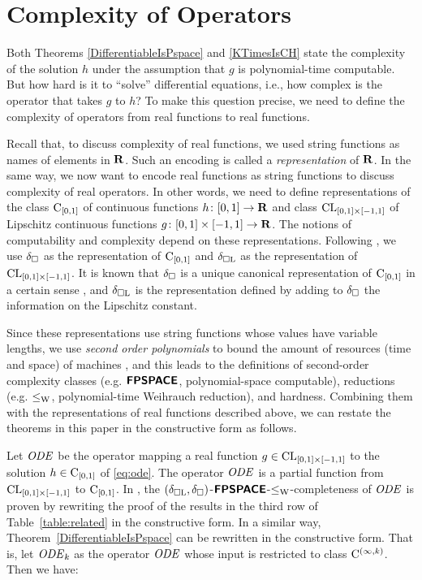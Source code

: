 \section{Complexity of Operators}

Both Theorems \ref{DifferentiableIsPspace} and \ref{KTimesIsCH}
state the complexity of the solution $h$ under the assumption 
that $g$ is polynomial-time computable.
But how hard is it to ``solve'' differential equations,
i.e., how complex is the operator that takes $g$ to $h$? 
To make this question precise,
we need to define the complexity of operators from real functions to real functions.

Recall that, to discuss complexity of real functions,
we used string functions as names of elements in $\mathbf R$. 
Such an encoding is called a \emph{representation} of $\mathbf R$.
In the same way, 
we now want to encode real functions as string functions
to discuss complexity of real operators. 
In other words, we need to define representations of
the class $\mathrm C _{[0, 1]}$ of continuous functions $h \colon [0,1] \to \mathbf R$ 
and class $\mathrm{CL} _{[0, 1] \times [-1, 1]}$ of Lipschitz continuous functions $g \colon [0, 1] \times [-1, 1] \to \mathbf R$. 
The notions of computability and complexity depend on these representations.
Following \cite{kawamura2010operators},
we use $\delta _\square$ as the representation of $\mathrm C_{[0,1]}$ and $\delta _{\square \mathrm L}$ as the representation of $\mathrm{CL}_{[0, 1] \times [-1, 1]}$.
It is known that 
$\delta _\square$ is a unique canonical representation of $\mathrm C_{[0, 1]}$ 
in a certain sense \cite{kawamura11:_funct_space_repres_and_polyn_time_comput}, 
and $\delta _{\square \mathrm L}$ is the representation defined by adding to $\delta _\square$
the information on the Lipschitz constant.

Since these representations use string functions 
whose values have variable lengths,
we use \emph{second order polynomials}
to bound the amount of resources (time and space) of machines
\cite{kawamura2010operators}, 
and this leads to the definitions of second-order complexity classes
(e.g. $\text{\bfseries \sffamily \upshape FPSPACE}$, polynomial-space computable),
reductions (e.g. $\leq _{\mathrm W}$, polynomial-time Weihrauch reduction), 
and hardness.
Combining them with the representations of real functions described above,
we can restate the theorems in this paper in the constructive form as follows.

Let $\mathit{ODE}$ be the operator mapping a real function $g \in \mathrm{CL}_{[0, 1] \times [-1, 1]}$ to
the solution $h \in \mathrm C_{[0, 1]}$ of \eqref{eq:ode}.
The operator $\mathit{ODE}$ is a partial function from $\mathrm{CL} _{[0, 1] \times [-1, 1]}$ to $\mathrm C _{[0, 1]}$.
In \cite[Theorem 4.9]{kawamura2010operators}, the
$(\delta _{\square \mathrm L}, \delta _\square)$-$\text{\bfseries \sffamily \upshape FPSPACE}$-$\leq _{\mathrm W}$-completeness of $\mathit{ODE}$ is proven
by rewriting 
the proof of the results in the third row of Table~\ref{table:related} in the constructive form.
In a similar way, Theorem~\ref{DifferentiableIsPspace} can be rewritten in the constructive form.
That is, let $\mathit{ODE} _k$ as the operator $\mathit{ODE}$ whose input is restricted to class $\mathrm C^{(\infty, k)}$. Then we have: 

